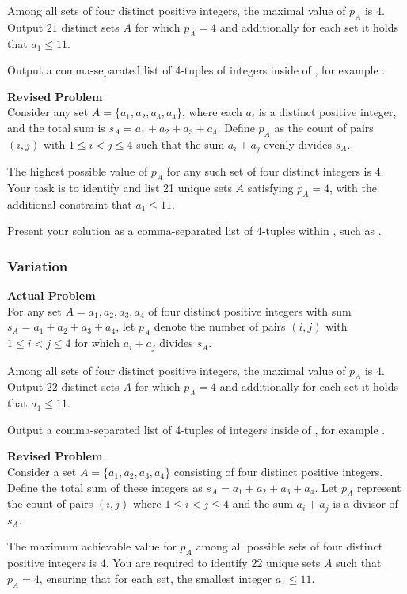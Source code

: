Among all sets of four distinct positive integers, the maximal value of $p_A$ is $4$.
Output $21$ distinct sets $A$ for which $p_A=4$ and additionally for each set it holds that $a_1 \leq 11$. 


Output a comma-separated list of 4-tuples of integers inside of \boxed, for example .

\textbf{Revised Problem}\\
Consider any set $A = \{a_1, a_2, a_3, a_4\}$, where each $a_i$ is a distinct positive integer, and the total sum is $s_A = a_1 + a_2 + a_3 + a_4$. Define $p_A$ as the count of pairs $(i, j)$ with $1 \leq i < j \leq 4$ such that the sum $a_i + a_j$ evenly divides $s_A$. 

The highest possible value of $p_A$ for any such set of four distinct integers is $4$. Your task is to identify and list 21 unique sets $A$ satisfying $p_A = 4$, with the additional constraint that $a_1 \leq 11$.

Present your solution as a comma-separated list of 4-tuples within \boxed, such as .

\subsubsection{Variation}
\textbf{Actual Problem}\\
For any set $A = {a_1, a_2, a_3, a_4}$ of four distinct positive integers with sum $s_A = a_1 + a_2 + a_3 + a_4$,
let $p_A$ denote the number of pairs $(i, j)$ with $1 \leq i < j \leq 4$ for which $a_i + a_j$ divides $s_A$. 

Among all sets of four distinct positive integers, the maximal value of $p_A$ is $4$.
Output $22$ distinct sets $A$ for which $p_A=4$ and additionally for each set it holds that $a_1 \leq 11$. 


Output a comma-separated list of 4-tuples of integers inside of \boxed, for example .

\textbf{Revised Problem}\\
Consider a set $A = \{a_1, a_2, a_3, a_4\}$ consisting of four distinct positive integers. Define the total sum of these integers as $s_A = a_1 + a_2 + a_3 + a_4$. Let $p_A$ represent the count of pairs $(i, j)$ where $1 \leq i < j \leq 4$ and the sum $a_i + a_j$ is a divisor of $s_A$.

The maximum achievable value for $p_A$ among all possible sets of four distinct positive integers is $4$. You are required to identify 22 unique sets $A$ such that $p_A=4$, ensuring that for each set, the smallest integer $a_1 \leq 11$.

